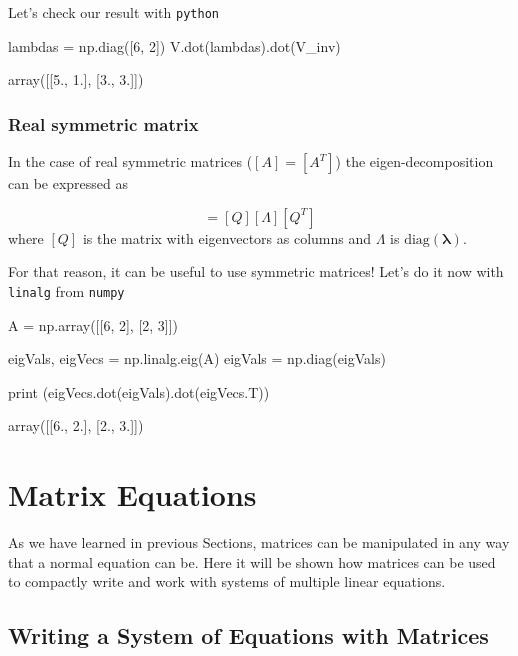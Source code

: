 Let's check our result with \texttt{python}

\begin{ipythonnon}
lambdas = np.diag([6, 2])	
V.dot(lambdas).dot(V_inv)
\end{ipythonnon}
\begin{ioutput}
array([[5., 1.],
       [3., 3.]])
\end{ioutput}

\subsubsection{Real symmetric matrix}
\label{real-symmetric-matrix}

In the case of real symmetric matrices ($[A]=[A^T]$) the eigen-decomposition can be expressed as

\begin{equation}
[A]=[Q][\Lambda][Q^T]
\end{equation} 
where $[Q]$ is the matrix with eigenvectors as columns and $\Lambda$ is $\textrm{diag}(\boldsymbol{\lambda})$.

For that reason, it can be useful to use symmetric matrices! Let's do it now with \texttt{linalg} from \texttt{numpy}

\begin{ipythonnon}
A = np.array([[6, 2], [2, 3]])

eigVals, eigVecs = np.linalg.eig(A)
eigVals = np.diag(eigVals)

print (eigVecs.dot(eigVals).dot(eigVecs.T))
\end{ipythonnon}
\begin{ioutput}
array([[6., 2.],
       [2., 3.]])
\end{ioutput}

\section{Matrix Equations}
\label{matrix-equations}
As we have learned in previous Sections, matrices can be manipulated in any way that a normal equation can be. Here it will be shown how matrices can be used to compactly write and work with systems of multiple linear equations. 

\subsection{Writing a System of Equations with Matrices}
\label{writing-a-system-of-equations-with-matrices}


